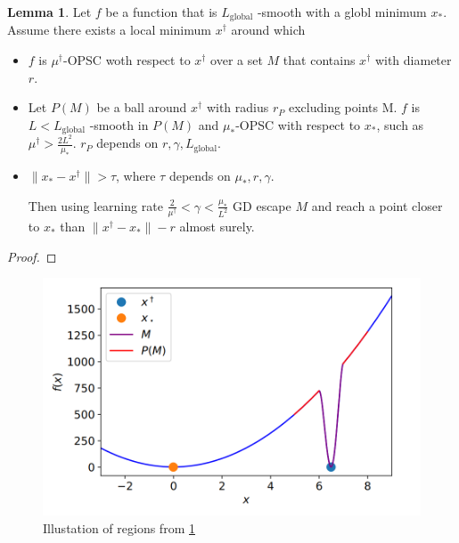 \documentclass{article}
\theoremstyle{definition}
\newtheorem{lemma}[theorem]{Lemma}
\begin{document}
\begin{lemma}\label{lma1}
    Let $f$ be a function that is 
    $L_{\mathrm{global}}$ -smooth with a globl minimum $x_\ast$. 
    Assume there exists a local minimum $x^\dagger$ around which
    \begin{itemize}
        \item $f$ is $\mu^\dagger$-OPSC woth respect to 
        $x^\dagger$ over a set $M$ that contains $x^\dagger$ with diameter $r$.
        
        \item Let $P(M)$ be a ball around $x^\dagger$ with radius 
        $r_P$ excluding points M. $f$ is 
        $L < L_{\mathrm{global}}$ -smooth in $P(M)$ and 
        $\mu_\ast$-OPSC with respect to $x_\ast$, 
        such as $\mu^\dagger > \frac{2L^2}{\mu_\ast}$. 
        $r_P$ depends on $r, \gamma, L_{\mathrm{global}}$.

        \item $\| x_\ast - x^\dagger \| > \tau$, where $\tau$ depends on $\mu_\ast, r, \gamma$. 

        Then using learning rate $\frac{2}{\mu^\dagger} < \gamma < \frac{\mu_\ast}{L^2}$
        GD escape $M$ and reach a point closer to $x_\ast$ than 
        $\| x^\dagger - x_\ast\| - r$ almost surely. 

    \end{itemize}
\end{lemma}
\begin{proof}
    
\end{proof}

\begin{figure}[h]
    \caption{Illustation of regions from \cref{lma1}}
    \label{fig:func}
    \centering
    \includegraphics[scale=0.2]{lemma1}
\end{figure}
\end{document}
